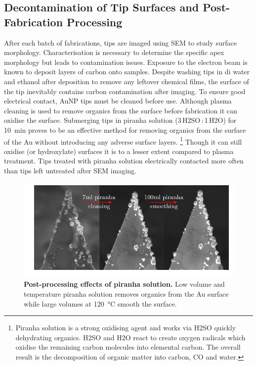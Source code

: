 \documentclass{article}
\begin{document}
\subsection{Decontamination of Tip Surfaces and Post-Fabrication Processing}

After each batch of fabrications, tips are imaged using SEM to study surface morphology. Characterisation is necessary to determine the specific apex morphology but leads to contamination issues. Exposure to the electron beam is known to deposit layers of carbon onto samples. Despite washing tips in \gls{di} water and ethanol after deposition to remove any leftover chemical films, the surface of the tip inevitably contains carbon contamination after imaging. To ensure good electrical contact, AuNP tips must be cleaned before use. Although plasma cleaning is used to remove organics from the surface before fabrication it can oxidise the surface. Submerging tips in piranha solution (3\,H\subs2SO\,:\,1\,H\subs2O) for \SI{10}{\minute} proves to be an effective method for removing organics from the surface of the Au without introducing any adverse surface layers.%
\footnote{Piranha solution is a strong oxidising agent and works via H\subs2SO quickly dehydrating organics. H\subs2SO and H\subs2O react to create oxygen radicals which oxidise the remaining carbon molecules into elemental carbon. The overall result is the decomposition of organic matter into carbon, CO and water.}
Though it can still oxidise {\color{red}(or hydroxylate)} surfaces it is to a lesser extent compared to plasma treatment. Tips treated with piranha solution electrically contacted more often than tips left untreated after SEM imaging.

\begin{figure}[bt]
\centering
\includegraphics[clip=true, trim=20 20 0 0]{figures/tip_post_processing}
\caption[Post-processing effects of piranha solution.]{\textbf{Post-processing effects of piranha solution.} Low volume and temperature piranha solution removes organics from the Au surface while large volumes at \SI{120}{\celsius} smooth the surface.}
\label{fig:tip_post_processing}
\end{figure}
\end{document}
